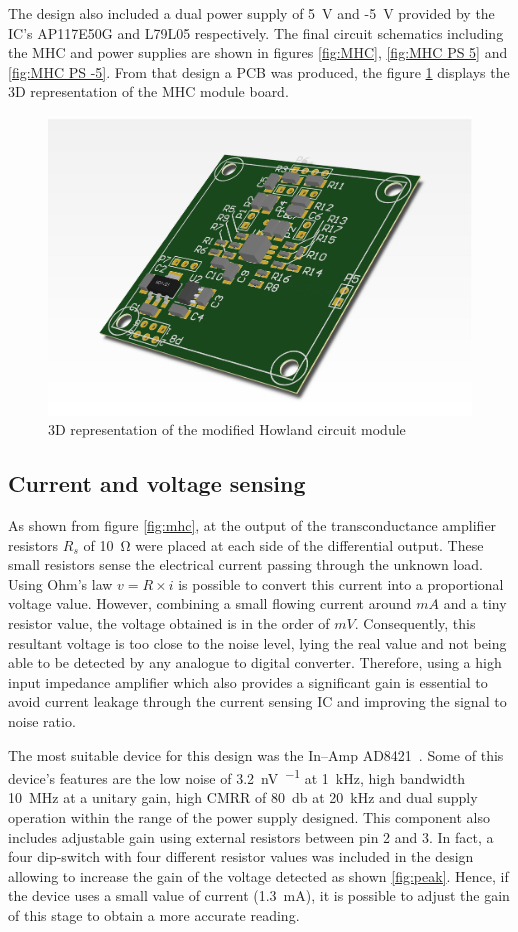 The design also included a dual power supply of \SI{5}{\volt} and -\SI{5}{\volt} provided by the IC's AP117E50G and L79L05 respectively. The final circuit schematics including the MHC and power supplies are shown in figures \ref{fig:MHC}, \ref{fig:MHC PS 5} and \ref{fig:MHC PS -5}. From that design a PCB was produced, the figure \ref{fig:3D MHC} displays the 3D representation of the MHC module board. 

\begin{figure}[!htpb]
	\centering
	\includegraphics[width=7.5 cm,keepaspectratio]{figure_MHC}
	\caption{3D representation of the modified Howland circuit module}
	\label{fig:3D MHC}
\end{figure}

\subsection{Current and voltage sensing}
As shown from figure \ref{fig:mhc}, at the output of the transconductance amplifier resistors $R_s$ of \SI{10}{\ohm} were placed at each side of the differential output. These small resistors sense the electrical current passing through the unknown load. Using Ohm's law $v=R \times i$ is possible to convert this current into a proportional voltage value. However, combining a small flowing current around $mA$ and a tiny resistor value, the voltage obtained is in the order of $mV$. Consequently, this resultant voltage is too close to the noise level, lying the real value and not being able to be detected by any analogue to digital converter. Therefore, using a high input impedance amplifier which also provides a significant gain is essential to avoid current leakage through the current sensing IC and improving the signal to noise ratio.  

The most suitable device for this design was the In–Amp AD8421~\cite{ad:AD8421}. Some of this device's features are the low noise of \SI{3.2}{\nano\volt\per{}} at \SI{1}{\kHz}, high bandwidth \SI{10}{\mega\hertz} at a unitary gain, high CMRR of \SI{80}{\decibel} at \SI{20}{\kHz} and dual supply operation within the range of the power supply designed. This component also includes adjustable gain using external resistors between pin 2 and 3. In fact, a four dip-switch with four different resistor values was included in the design allowing to increase the gain of the voltage detected as shown \ref{fig:peak}. Hence, if the device uses a small value of current (\SI{1.3}{\mA}), it is possible to adjust the gain of this stage to obtain a more accurate reading.

